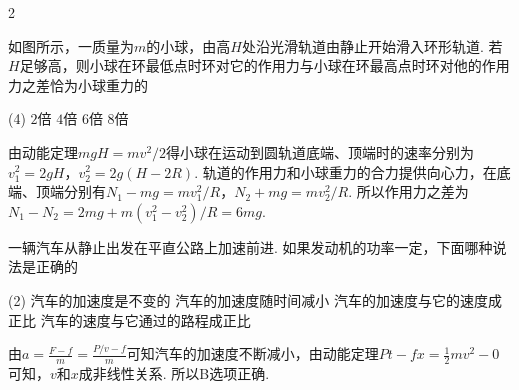 \begin{paracol}{2}
\begin{problem} %
    如图所示，一质量为$m$的小球，由高$H$处沿光滑轨道由静止开始滑入环形轨道. 若$H$足够高，则小球在环最低点时环对它的作用力与小球在环最高点时环对他的作用力之差恰为小球重力的
    \begin{tasks}(4)
        \task $2$倍
        \task $4$倍
        \task[\true] $6$倍
        \task $8$倍
    \end{tasks}
    \switchcolumn\vspace*{\fill}\centering
    \vspace*{\fill}
\end{problem}
\end{paracol}
\begin{solution}
由动能定理$mgH=mv^2/2$得小球在运动到圆轨道底端、顶端时的速率分别为$v_1^2=2gH$，$v_2^2=2g(H-2R)$. 轨道的作用力和小球重力的合力提供向心力，在底端、顶端分别有$N_1-mg=mv_1^2/R$，$N_2+mg=mv_2^2/R$. 所以作用力之差为$N_1-N_2=2mg+m(v_1^2-v_2^2)/R=6mg$.
\end{solution}

\begin{problem}
一辆汽车从静止出发在平直公路上加速前进. 如果发动机的功率一定，下面哪种说法是正确的
\begin{tasks}(2)
    \task 汽车的加速度是不变的
    \task[\true] 汽车的加速度随时间减小
    \task 汽车的加速度与它的速度成正比
    \task 汽车的速度与它通过的路程成正比
\end{tasks}
\end{problem}
\begin{solution}
    由$a=\frac{F-f}{m}=\frac{P/v-f}{m}$可知汽车的加速度不断减小，由动能定理$Pt-fx=\frac{1}{2}mv^2-0$可知，$v$和$x$成非线性关系. 所以B选项正确.
\end{solution}

